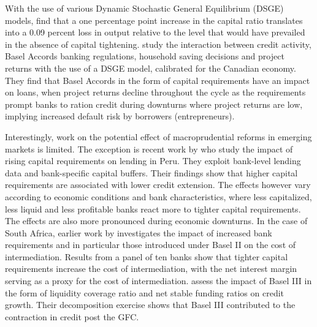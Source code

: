\documentclass[
  letterpaper,
  DIV=11,
  numbers=noendperiod]{scrartcl}
\begin{document}
With the use of various Dynamic Stochastic General Equilibrium (DSGE)
models, \cite{angelini2015b} find that a one percentage point increase
in the capital ratio translates into a 0.09 percent loss in output
relative to the level that would have prevailed in the absence of
capital tightening. \cite{berka2018basel} study the interaction between
credit activity, Basel Accords banking regulations, household saving
decisions and project returns with the use of a DSGE model, calibrated
for the Canadian economy. They find that Basel Accords in the form of
capital requirements have an impact on loans, when project returns
decline throughout the cycle as the requirements prompt banks to ration
credit during downturns where project returns are low, implying
increased default risk by borrowers (entrepreneurs).

Interestingly, work on the potential effect of macroprudential reforms
in emerging markets is limited. The exception is recent work by
\cite{fang2022bank} who study the impact of rising capital requirements
on lending in Peru. They exploit bank-level lending data and
bank-specific capital buffers. Their findings show that higher capital
requirements are associated with lower credit extension. The effects
however vary according to economic conditions and bank characteristics,
where less capitalized, less liquid and less profitable banks react more
to tighter capital requirements. The effects are also more pronounced
during economic downturns. In the case of South Africa, earlier work by
\cite{maredza2016capital} investigates the impact of increased bank
requirements and in particular those introduced under Basel II on the
cost of intermediation. Results from a panel of ten banks show that
tighter capital requirements increase the cost of intermediation, with
the net interest margin serving as a proxy for the cost of
intermediation. \cite{gumata2017bank} assess the impact of Basel III in
the form of liquidity coverage ratio and net stable funding ratios on
credit growth. Their decomposition exercise shows that Basel III
contributed to the contraction in credit post the GFC.
\end{document}
